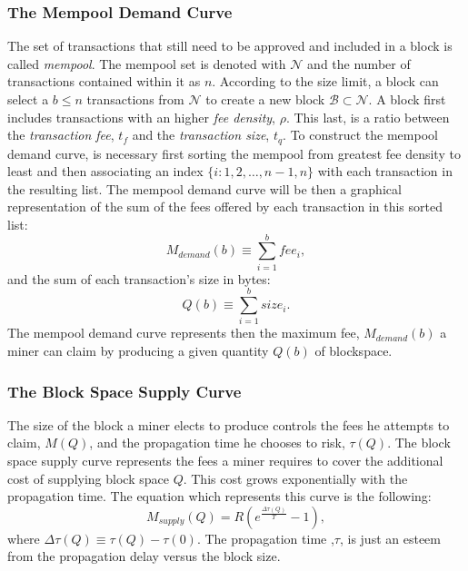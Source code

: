 \documentclass[USenglish]{uit-thesis}
\begin{document}
\subsubsection{The Mempool Demand Curve}
\label{sec:mempooldemand}
The set of transactions that still need to be approved and included
in a block is called \emph{mempool}.
The mempool set is denoted with $\mathcal{N}$ and the number
of transactions contained within it as $n$.
According to the size limit, a block can select a $b \leq n$
transactions from $\mathcal{N}$ to create a
new block $\mathcal{B} \subset \mathcal{N}$.
A block first includes transactions with an higher \emph{fee density}, $\rho$.
This last, is a ratio between
the \emph{transaction fee}, $t_f$ and the \emph{transaction size}, $t_q$.
To construct the mempool demand
curve, is necessary first sorting the mempool from
greatest fee density to least and then
associating an index $\{i: 1,2,\dots,n-1,n\}$ with each
transaction in the resulting list.
The mempool demand curve will be then a graphical
representation of the sum of the fees offered
by each transaction in this sorted list:
\begin{equation}
\label{eq:memdemandcurve}
M_{demand}(b) \equiv \sum_{i=1}^{b} fee_i,
\end{equation}
and the sum of each transaction's size in bytes:
\begin{equation}
\label{eq:transactionsize}
Q(b) \equiv \sum_{i = 1}^{b} size_i.
\end{equation}
The mempool demand curve represents then the maximum fee,
$M_{demand}(b)$
a miner can claim by producing a given quantity $Q(b)$ of blockspace.

\subsubsection{The Block Space Supply Curve}
\label{sec:blockspacesupply}
The size of the block a miner elects to produce controls the fees he attempts to claim, $M(Q)$,
and the propagation time he chooses to risk, $\tau(Q)$. The block space supply curve represents
the fees a miner requires to cover the additional cost of supplying block space $Q$. This cost grows
exponentially with the propagation time. The equation which represents this curve is the
following:
\begin{equation}
\label{eq:blockspacesupply}
M_{supply}(Q) = R\left(e^{\frac{\Delta \tau (Q)}{T}} - 1\right),
\end{equation}
where $\Delta \tau (Q) \equiv \tau(Q) - \tau(0)$. The propagation time ,$\tau$, is just an esteem from
the propagation delay versus the block size.
\end{document}

